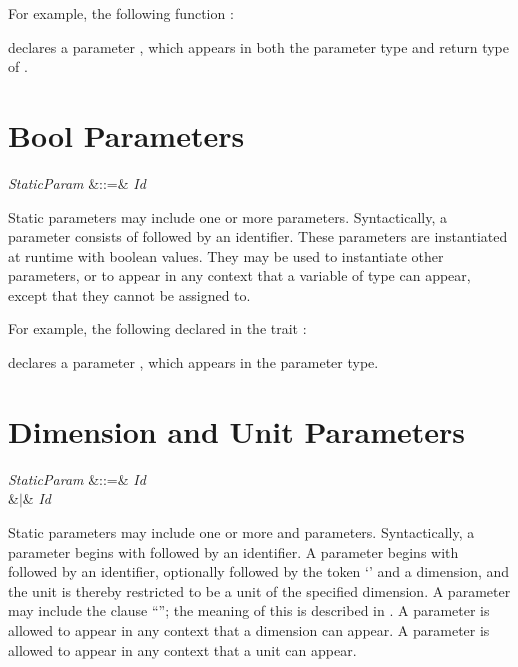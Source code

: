 For example, the following function :

declares a  parameter , which appears in both the parameter
type and return type of .



\section{Bool Parameters}

\begin{Grammar}
\emph{StaticParam} &::=&  \emph{Id} \\
\end{Grammar}

Static parameters may include one or more  parameters.
Syntactically, a  parameter consists of
 followed by an identifier.
These parameters are instantiated at runtime with boolean values. They may
be used to instantiate other  parameters, or
to appear in any context that a variable of type  can appear,
except that they cannot be assigned to.


For example, the following  declared in the trait :

declares a  parameter , which appears in the parameter type.


\section{Dimension and Unit Parameters}

\begin{Grammar}
\emph{StaticParam} &::=&  \emph{Id} \\
&$|$&  \emph{Id} 
 \\
\end{Grammar}


Static parameters may include one or more  and 
parameters.  Syntactically, a  parameter begins with
 followed by an identifier.
A  parameter begins with 
followed by an identifier, optionally followed by the token `\EXP{\COLONOP}'
and a dimension, and the unit is thereby restricted to be a unit of
the specified dimension.
A  parameter may include the clause
``''; the meaning of this is described
in .
A  parameter is allowed to appear in any context that a
dimension can appear.
A  parameter is allowed to appear in any context that a unit
can appear.


